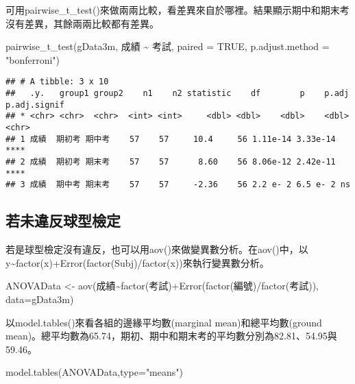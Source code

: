 \documentclass[
]{book}
\newenvironment{Shaded}{\begin{snugshade}}{\end{snugshade}}
\newcommand{\AttributeTok}[1]{\textcolor[rgb]{0.77,0.63,0.00}{#1}}
\newcommand{\ConstantTok}[1]{\textcolor[rgb]{0.00,0.00,0.00}{#1}}
\newcommand{\FunctionTok}[1]{\textcolor[rgb]{0.00,0.00,0.00}{#1}}
\newcommand{\NormalTok}[1]{#1}
\newcommand{\OtherTok}[1]{\textcolor[rgb]{0.56,0.35,0.01}{#1}}
\newcommand{\SpecialCharTok}[1]{\textcolor[rgb]{0.00,0.00,0.00}{#1}}
\newcommand{\StringTok}[1]{\textcolor[rgb]{0.31,0.60,0.02}{#1}}
\begin{document}
可用pairwise\_t\_test()來做兩兩比較，看差異來自於哪裡。結果顯示期中和期末考沒有差異，其餘兩兩比較都有差異。

\begin{Shaded}
\begin{Highlighting}[]
\FunctionTok{pairwise\_t\_test}\NormalTok{(gData3m, 成績 }\SpecialCharTok{\textasciitilde{}}\NormalTok{ 考試, }\AttributeTok{paired =} \ConstantTok{TRUE}\NormalTok{, }\AttributeTok{p.adjust.method =} \StringTok{"bonferroni"}\NormalTok{)}
\end{Highlighting}
\end{Shaded}

\begin{verbatim}
## # A tibble: 3 x 10
##   .y.   group1 group2    n1    n2 statistic    df        p    p.adj p.adj.signif
## * <chr> <chr>  <chr>  <int> <int>     <dbl> <dbl>    <dbl>    <dbl> <chr>       
## 1 成績  期初考 期中考    57    57     10.4     56 1.11e-14 3.33e-14 ****        
## 2 成績  期初考 期末考    57    57      8.60    56 8.06e-12 2.42e-11 ****        
## 3 成績  期中考 期末考    57    57     -2.36    56 2.2 e- 2 6.5 e- 2 ns
\end{verbatim}

\hypertarget{ux82e5ux672aux9055ux53cdux7403ux578bux6aa2ux5b9a}{%
\subsection{若未違反球型檢定}\label{ux82e5ux672aux9055ux53cdux7403ux578bux6aa2ux5b9a}}

若是球型檢定沒有違反，也可以用aov()來做變異數分析。在aov()中，以y\textasciitilde factor(x)+Error(factor(Subj)/factor(x))來執行變異數分析。

\begin{Shaded}
\begin{Highlighting}[]
\NormalTok{ANOVAData }\OtherTok{\textless{}{-}} \FunctionTok{aov}\NormalTok{(成績}\SpecialCharTok{\textasciitilde{}}\FunctionTok{factor}\NormalTok{(考試)}\SpecialCharTok{+}\FunctionTok{Error}\NormalTok{(}\FunctionTok{factor}\NormalTok{(編號)}\SpecialCharTok{/}\FunctionTok{factor}\NormalTok{(考試)), }\AttributeTok{data=}\NormalTok{gData3m)}
\end{Highlighting}
\end{Shaded}

以model.tables()來看各組的邊緣平均數(marginal mean)和總平均數(ground mean)。總平均數為65.74，期初、期中和期末考的平均數分別為82.81、54.95與59.46。

\begin{Shaded}
\begin{Highlighting}[]
\FunctionTok{model.tables}\NormalTok{(ANOVAData,}\AttributeTok{type=}\StringTok{"means"}\NormalTok{)}
\end{Highlighting}
\end{Shaded}
\end{document}

